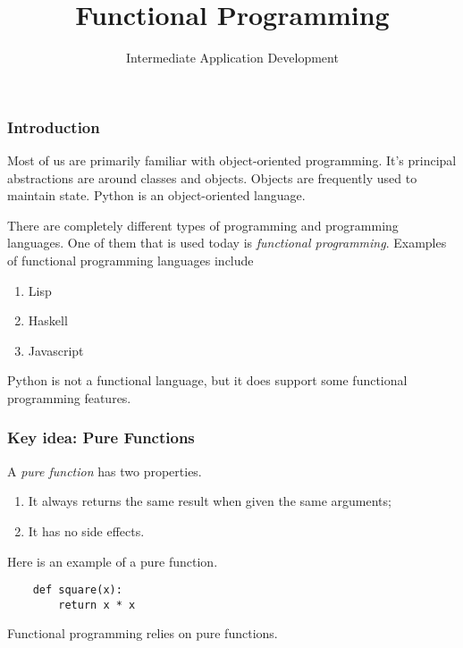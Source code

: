 \documentclass[10pt]{beamer}
\title{Functional Programming}
\author[IN608]{Intermediate Application Development}
\institute[Otago Polytechnic]{
  Otago Polytechnic \\
  Dunedin, New Zealand \\
  Kaiako: Tom Clark
}
\date{}
\begin{document}
\begin{frame}[plain]
  \titlepage
\end{frame}

\begin{frame}
  \frametitle{Introduction}
  
  Most of us are primarily familiar with object-oriented programming. It's 
  principal abstractions are around classes and objects. Objects are frequently used
  to maintain state. Python is an object-oriented language.
  
  \vspace{5mm}
  There are completely different types of programming and programming languages. One
  of them that is used today is \emph{functional programming}. Examples of functional
  programming languages include
  \begin{enumerate}
    \item Lisp
    \item Haskell
    \item Javascript
  \end{enumerate}
  
  \vspace{5mm}
  Python is not a functional language, but it does support some functional programming
  features.  
\end{frame}

\begin{frame}[fragile]
  \frametitle{Key idea: Pure Functions}
  
  A \emph{pure function} has two properties.
  \begin{enumerate}
    \item It always returns the same result when given the same arguments;
    \item It has no side effects.
  \end{enumerate}
  
  \vspace{5mm}
  Here is an example of a pure function.
  \vspace{5mm}
  \begin{verbatim}
    def square(x):
        return x * x
  \end{verbatim}
  
  \vspace{5mm}
  Functional programming relies on pure functions.
        
\end{frame}
\end{document}

